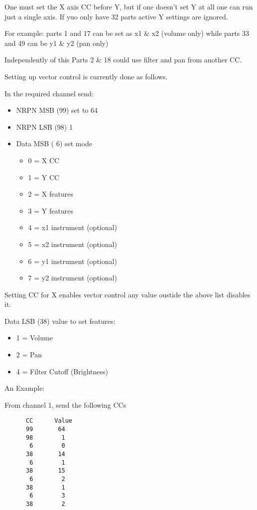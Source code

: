    One must set the X axis CC before Y, but if one doesn't set Y at all one
   can run just a single axis. If yuo only have 32 parts active Y settings
   are ignored.

   For example:
   parts 1 and 17 can be set as x1 \& x2 (volume only) while parts 33 and 49
   can be y1 \& y2 (pan only)

   Independently of this Parts 2 \& 18 could use filter and pan from another
   CC.

   Setting up vector control is currently done as follows.

   In the required channel send:

   \begin{itemize}
      \item NRPN MSB (99)  set to 64
      \item NRPN LSB (98)  1
      \item Data MSB ( 6) set mode
      \begin{itemize}
         \item 0 = X CC
         \item 1 = Y CC
         \item 2 = X features
         \item 3 = Y features
         \item 4 = x1 instrument (optional)
         \item 5 = x2 instrument (optional)
         \item 6 = y1 instrument (optional)
         \item 7 = y2 instrument (optional)
      \end{itemize}
   \end{itemize}

   Setting CC for X enables vector control any value oustide the above list
   disables it.

   Data LSB (38) value to set features:

   \begin{itemize}
       \item 1 = Volume
       \item 2 = Pan
       \item 4 = Filter Cutoff (Brightness)
   \end{itemize}
    
   An Example:

   From channel 1, send the following CCs

   \begin{verbatim}
      CC      Value
      99       64
      98        1
       6        0
      38       14
       6        1
      38       15
       6        2
      38        1
       6        3
      38        2
   \end{verbatim}

